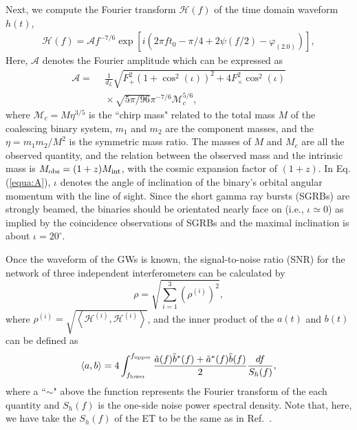 \documentclass[aps,prd,nofootinbib,amsmath,amssymb,superscriptaddress,twocolumn,10pt]{revtex4}%
\begin{document}
Next, we compute the Fourier transform $\mathcal{H}(f)$ of the time domain waveform $h(t)$,
\begin{align}
\mathcal{H}(f)=\mathcal{A}f^{-7/6}\exp[i(2\pi ft_0-\pi/4+2\psi(f/2)-\varphi_{(2.0)})],
\label{equa:hf}
\end{align}
Here, $\mathcal{A}$ denotes the Fourier amplitude which can be expressed as
\begin{align}
\mathcal{A}=&~~\frac{1}{d_L}\sqrt{F_+^2(1+\cos^2(\iota))^2+4F_\times^2\cos^2(\iota)}\nonumber\\
            &~~\times \sqrt{5\pi/96}\pi^{-7/6}\mathcal{M}_c^{5/6},
\label{equa:A}
\end{align}
where $\mathcal{M}_c=M \eta^{3/5}$ is the ``chirp mass" related to the total mass $M$ of the coalescing binary system, $m_1$ and $m_2$ are the component masses, and the $\eta=m_1 m_2/M^2$ is the symmetric mass ratio. The masses of $M$ and $M_{c}$ are all the observed quantity, and the relation between the observed mass and the intrinsic mass is $M_{\rm obs}=(1+z)M_{\rm int}$, with the cosmic expansion factor of $(1+z)$.
In Eq. (\ref{equa:A}), $\iota$ denotes the angle of inclination of the binary's orbital angular momentum with the line of sight. Since the short gamma ray bursts (SGRBs) are strongly beamed, the binaries should be orientated nearly face on (i.e., $\iota\simeq 0$) as implied by the coincidence observations of SGRBs and the maximal inclination is about $\iota=20^\circ$.

Once the waveform of the GWs is known, the signal-to-noise ratio (SNR) for the network of three independent interferometers can be calculated by
\begin{equation}
\rho=\sqrt{\sum\limits_{i=1}^{3}(\rho^{(i)})^2},
\label{euqa:rho}
\end{equation}
where $\rho^{(i)}=\sqrt{\left\langle \mathcal{H}^{(i)},\mathcal{H}^{(i)}\right\rangle}$, and the inner product of the $a(t)$ and $b(t)$ can be defined as \begin{equation}
\left\langle{a,b}\right\rangle=4\int_{f_{\rm lower}}^{f_{\rm upper}}\frac{\tilde a(f)\tilde b^\ast(f)+\tilde a^\ast(f)\tilde b(f)}{2}\frac{df}{S_h(f)},
\label{euqa:product}
\end{equation}
where a ``$\sim$" above the function represents the Fourier transform of the each quantity and $S_h(f)$ is the one-side noise power spectral density. Note that, here, we have take the $S_h(f)$ of the ET to be the same as in Ref.~\cite{Zhao:2010sz}.
\end{document}
